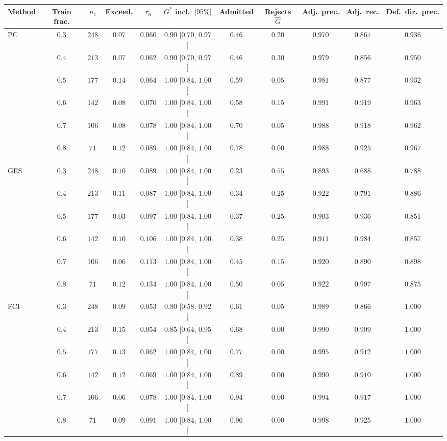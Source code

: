 \begin{tabular}{lcccccccccc}
\toprule
Method & Train frac. & $n_c$ & Exceed. & $\tau_\alpha$ & $G^\ast$ incl.\ [$95\%$] & Admitted & Rejects $\widehat G$ & Adj.\ prec. & Adj.\ rec. & Def.\ dir.\ prec. \\
\midrule
PC & $0.3$ & $248$ & $0.07$ & $0.060$ & $0.90$ [$0.70$, $0.97$] & $0.46$ & $0.20$ & $0.970$ & $0.861$ & $0.936$ \\
 & $0.4$ & $213$ & $0.07$ & $0.062$ & $0.90$ [$0.70$, $0.97$] & $0.46$ & $0.30$ & $0.979$ & $0.856$ & $0.950$ \\
 & $0.5$ & $177$ & $0.14$ & $0.064$ & $1.00$ [$0.84$, $1.00$] & $0.59$ & $0.05$ & $0.981$ & $0.877$ & $0.932$ \\
 & $0.6$ & $142$ & $0.08$ & $0.070$ & $1.00$ [$0.84$, $1.00$] & $0.58$ & $0.15$ & $0.991$ & $0.919$ & $0.963$ \\
 & $0.7$ & $106$ & $0.08$ & $0.078$ & $1.00$ [$0.84$, $1.00$] & $0.70$ & $0.05$ & $0.988$ & $0.918$ & $0.962$ \\
 & $0.8$ & $71$ & $0.12$ & $0.089$ & $1.00$ [$0.84$, $1.00$] & $0.78$ & $0.00$ & $0.988$ & $0.925$ & $0.967$ \\
\midrule
GES & $0.3$ & $248$ & $0.10$ & $0.089$ & $1.00$ [$0.84$, $1.00$] & $0.23$ & $0.55$ & $0.893$ & $0.688$ & $0.788$ \\
 & $0.4$ & $213$ & $0.11$ & $0.087$ & $1.00$ [$0.84$, $1.00$] & $0.34$ & $0.25$ & $0.922$ & $0.791$ & $0.886$ \\
 & $0.5$ & $177$ & $0.03$ & $0.097$ & $1.00$ [$0.84$, $1.00$] & $0.37$ & $0.25$ & $0.903$ & $0.936$ & $0.851$ \\
 & $0.6$ & $142$ & $0.10$ & $0.106$ & $1.00$ [$0.84$, $1.00$] & $0.38$ & $0.25$ & $0.911$ & $0.984$ & $0.857$ \\
 & $0.7$ & $106$ & $0.06$ & $0.113$ & $1.00$ [$0.84$, $1.00$] & $0.45$ & $0.15$ & $0.920$ & $0.890$ & $0.898$ \\
 & $0.8$ & $71$ & $0.12$ & $0.134$ & $1.00$ [$0.84$, $1.00$] & $0.50$ & $0.05$ & $0.922$ & $0.997$ & $0.875$ \\
\midrule
FCI & $0.3$ & $248$ & $0.09$ & $0.053$ & $0.80$ [$0.58$, $0.92$] & $0.61$ & $0.05$ & $0.989$ & $0.866$ & $1.000$ \\
 & $0.4$ & $213$ & $0.15$ & $0.054$ & $0.85$ [$0.64$, $0.95$] & $0.68$ & $0.00$ & $0.990$ & $0.909$ & $1.000$ \\
 & $0.5$ & $177$ & $0.13$ & $0.062$ & $1.00$ [$0.84$, $1.00$] & $0.77$ & $0.00$ & $0.995$ & $0.912$ & $1.000$ \\
 & $0.6$ & $142$ & $0.12$ & $0.069$ & $1.00$ [$0.84$, $1.00$] & $0.89$ & $0.00$ & $0.990$ & $0.910$ & $1.000$ \\
 & $0.7$ & $106$ & $0.06$ & $0.078$ & $1.00$ [$0.84$, $1.00$] & $0.94$ & $0.00$ & $0.994$ & $0.917$ & $1.000$ \\
 & $0.8$ & $71$ & $0.09$ & $0.091$ & $1.00$ [$0.84$, $1.00$] & $0.96$ & $0.00$ & $0.998$ & $0.925$ & $1.000$ \\
\bottomrule
\end{tabular}
